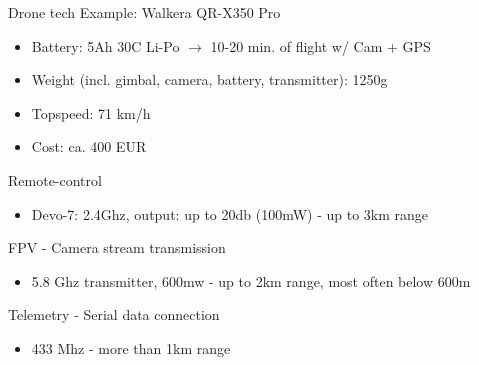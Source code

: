 \documentclass[aspectratio=169]{beamer}
\begin{document}
\begin{frame}{Drone tech}
	Example: Walkera QR-X350 Pro
	\begin{itemize}
		\item Battery: 5Ah 30C Li-Po $\rightarrow$ 10-20 min. of flight w/ Cam + GPS
		\item Weight (incl. gimbal, camera, battery, transmitter): 1250g
		\item Topspeed: 71 km/h
		\item Cost: ca. 400 EUR
	\end{itemize}
	
	Remote-control
	\begin{itemize}
		\item Devo-7: 2.4Ghz, output: up to 20db (100mW) - up to 3km range
	\end{itemize}
	
	FPV - Camera stream transmission
	\begin{itemize}
		\item 5.8 Ghz transmitter, 600mw - up to 2km range, most often below 600m
	\end{itemize}
	
	Telemetry - Serial data connection
	\begin{itemize}
		\item 433 Mhz - more than 1km range
	\end{itemize}
\end{frame}
\end{document}
